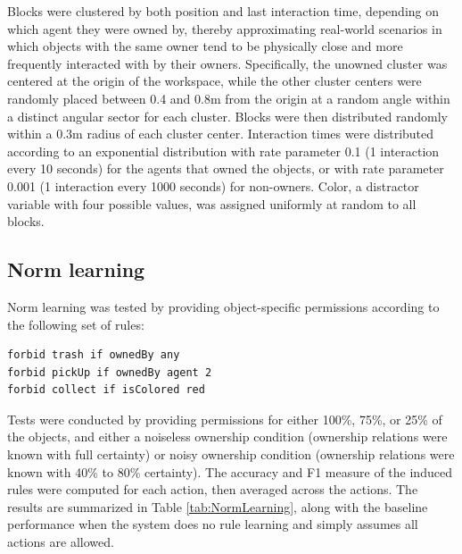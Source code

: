 \documentclass[letterpaper]{article} %
\begin{document}
Blocks were clustered by both position and last interaction time, depending on which agent they were owned by, thereby approximating real-world scenarios in which objects with the same owner tend to be physically close and more frequently interacted with by their owners. Specifically, the unowned cluster was centered at the origin of the workspace, while the other cluster centers were randomly placed between 0.4 and 0.8m from the origin at a random angle within a distinct angular sector for each cluster. Blocks were then distributed randomly within a 0.3m radius of each cluster center. Interaction times were distributed according to an exponential distribution with rate parameter 0.1 (1 interaction every 10 seconds) for the agents that owned the objects, or with rate parameter 0.001 (1 interaction every 1000 seconds) for non-owners. Color, a distractor variable with four possible values, was assigned uniformly at random to all blocks.

\subsection{Norm learning}

Norm learning was tested by providing object-specific permissions according to the following set of rules:
\begin{scriptsize}
\begin{verbatim}
forbid trash if ownedBy any
forbid pickUp if ownedBy agent 2
forbid collect if isColored red
\end{verbatim}
\end{scriptsize}
Tests were conducted by providing permissions for either 100\%, 75\%, or 25\% of the objects, and either a noiseless ownership condition (ownership relations were known with full certainty) or noisy ownership condition (ownership relations were known with 40\% to 80\% certainty). The accuracy and F1 measure of the induced rules were computed for each action, then averaged across the actions. The results are summarized in Table \ref{tab:NormLearning}, along with the baseline performance when the system does no rule learning and simply assumes all actions are allowed.
\end{document}
